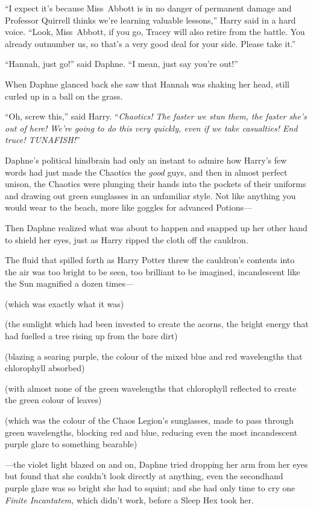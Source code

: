“I expect it’s because Miss~Abbott is in no danger of permanent damage and
Professor Quirrell thinks we’re learning valuable lessons,” Harry said in a
hard voice. “Look, Miss~Abbott, if you go, Tracey will also retire from the
battle. You already outnumber us, so that’s a very good deal for your side.
Please take it.”

“Hannah, just go!” said Daphne. “I mean, just say you’re out!”

When Daphne glanced back she saw that Hannah was shaking her head, still curled
up in a ball on the grass.

“Oh, screw this,” said Harry. “\emph{Chaotics! The faster we stun them, the
faster she’s out of here! We’re going to do this very quickly, even if we take
casualties! End truce! TUNAFISH!}”

Daphne’s political hindbrain had only an instant to admire how Harry’s few
words had just made the Chaotics the \emph{good} guys, and then in almost
perfect unison, the Chaotics were plunging their hands into the pockets of
their uniforms and drawing out green sunglasses in an unfamiliar style. Not
like anything you would wear to the beach, more like goggles for advanced
Potions—

Then Daphne realized what was about to happen and snapped up her other hand to
shield her eyes, just as Harry ripped the cloth off the cauldron.

The fluid that spilled forth as Harry Potter threw the cauldron’s contents into
the air was too bright to be seen, too brilliant to be imagined, incandescent
like the Sun magnified a dozen times—

(which was exactly what it was)

(the sunlight which had been invested to create the acorns, the bright energy
that had fuelled a tree rising up from the bare dirt)

(blazing a searing purple, the colour of the mixed blue and red wavelengths that
chlorophyll absorbed)

(with almost none of the green wavelengths that chlorophyll reflected to create
the green colour of leaves)

(which was the colour of the Chaos Legion’s sunglasses, made to pass through
green wavelengths, blocking red and blue, reducing even the most incandescent
purple glare to something bearable)

—the violet light blazed on and on, Daphne tried dropping her arm from her
eyes but found that she couldn’t look directly at anything, even the secondhand
purple glare was so bright she had to squint; and she had only time to cry one
\emph{Finite Incantatem,} which didn’t work, before a Sleep Hex took her.

